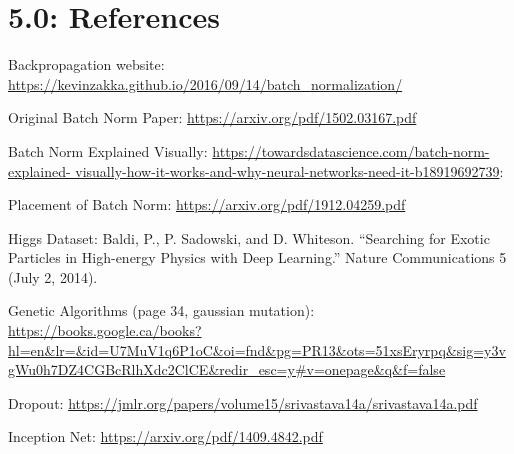 \documentclass{article}
\begin{document}
\newpage
\section*{5.0: References}

Backpropagation website:
\url{https://kevinzakka.github.io/2016/09/14/batch_normalization/}

\noindent Original Batch Norm Paper:
\url{https://arxiv.org/pdf/1502.03167.pdf}

\noindent Batch Norm Explained Visually:
\url{https://towardsdatascience.com/batch-norm-explained-
visually-how-it-works-and-why-neural-networks-need-it-b18919692739}:


\noindent Placement of Batch Norm:
\url{https://arxiv.org/pdf/1912.04259.pdf}

\noindent Higgs Dataset:
Baldi, P., P. Sadowski, and D. Whiteson. “Searching for Exotic Particles in High-energy Physics with Deep Learning.” Nature Communications 5 (July 2, 2014).

\noindent Genetic Algorithms (page 34, gaussian mutation):
\url{https://books.google.ca/books?hl=en&lr=&id=U7MuV1q6P1oC&oi=fnd&pg=PR13&ots=51xsEryrpq&sig=y3vgWu0h7DZ4CGBcRlhXdc2ClCE&redir_esc=y#v=onepage&q&f=false}

\noindent Dropout: 
\url{https://jmlr.org/papers/volume15/srivastava14a/srivastava14a.pdf}


\noindent Inception Net:
\url{https://arxiv.org/pdf/1409.4842.pdf}




\newpage
\end{document}
